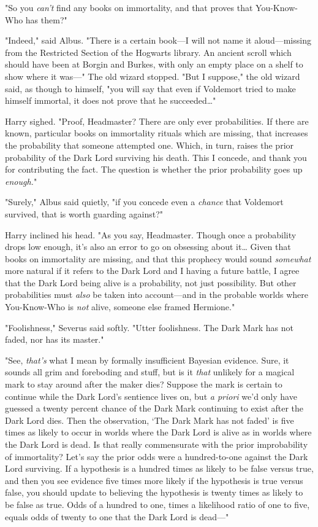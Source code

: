 "So you \emph{can't} find any books on immortality, and that proves that 
You-Know-Who has them?"

"Indeed," said Albus. "There is a certain book---I will not name it 
aloud---missing from the Restricted Section of the Hogwarts library. An ancient 
scroll which should have been at Borgin and Burkes, with only an empty place on 
a shelf to show where it was---" The old wizard stopped. "But I suppose," the 
old wizard said, as though to himself, "you will say that even if Voldemort 
tried to make himself immortal, it does not prove that he succeeded{\ldots}"

Harry sighed. "Proof, Headmaster? There are only ever probabilities. If there 
are known, particular books on immortality rituals which are missing, that 
increases the probability that someone attempted one. Which, in turn, raises 
the prior probability of the Dark Lord surviving his death. This I concede, and 
thank you for contributing the fact. The question is whether the prior 
probability goes up \emph{enough.}"

"Surely," Albus said quietly, "if you concede even a \emph{chance} that 
Voldemort survived, that is worth guarding against?"

Harry inclined his head. "As you say, Headmaster. Though once a probability 
drops low enough, it's also an error to go on obsessing about it{\ldots} Given 
that books on immortality are missing, and that this prophecy would sound 
\emph{somewhat} more natural if it refers to the Dark Lord and I having a 
future battle, I agree that the Dark Lord being alive is a probability, not 
just possibility. But other probabilities must \emph{also} be taken into 
account---and in the probable worlds where You-Know-Who is \emph{not} alive, 
someone else framed Hermione."

"Foolishness," Severus said softly. "Utter foolishness. The Dark Mark has not 
faded, nor has its master."

"See, \emph{that's} what I mean by formally insufficient Bayesian evidence. 
Sure, it sounds all grim and foreboding and stuff, but is it \emph{that} 
unlikely for a magical mark to stay around after the maker dies? Suppose the 
mark is certain to continue while the Dark Lord's sentience lives on, but 
\emph{a priori} we'd only have guessed a twenty percent chance of the Dark Mark 
continuing to exist after the Dark Lord dies. Then the observation, `The Dark 
Mark has not faded' is five times as likely to occur in worlds where the Dark 
Lord is alive as in worlds where the Dark Lord is dead. Is that really 
commensurate with the prior improbability of immortality? Let's say the prior 
odds were a hundred-to-one against the Dark Lord surviving. If a hypothesis is 
a hundred times as likely to be false versus true, and then you see evidence 
five times more likely if the hypothesis is true versus false, you should 
update to believing the hypothesis is twenty times as likely to be false as 
true. Odds of a hundred to one, times a likelihood ratio of one to five, equals 
odds of twenty to one that the Dark Lord is dead---"

